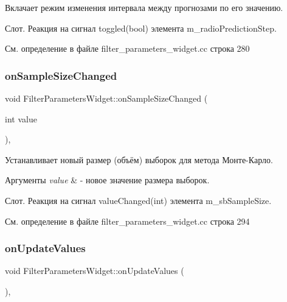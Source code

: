 Вклачает режим изменения интервала между прогнозами по его значению. 

Слот. Реакция на сигнал toggled(bool) элемента m\+\_\+radio\+Prediction\+Step. 

См. определение в файле filter\+\_\+parameters\+\_\+widget.\+cc строка 280

\hypertarget{class_filter_parameters_widget_afc9adb2c97bb297c29a86c2e9ee123b5}{}\label{class_filter_parameters_widget_afc9adb2c97bb297c29a86c2e9ee123b5} 
\subsubsection{\texorpdfstring{on\+Sample\+Size\+Changed}{onSampleSizeChanged}}
{\footnotesize\ttfamily void Filter\+Parameters\+Widget\+::on\+Sample\+Size\+Changed (\begin{DoxyParamCaption}\item[{int}]{value }\end{DoxyParamCaption})\hspace{0.3cm}{\ttfamily [private]}, {\ttfamily [slot]}}



Устанавливает новый размер (объём) выборок для метода Монте-\/Карло. 


\begin{DoxyParams}{Аргументы}
{\em value} & -\/ новое значение размера выборок.\\
\hline
\end{DoxyParams}
Слот. Реакция на сигнал value\+Changed(int) элемента m\+\_\+sb\+Sample\+Size. 

См. определение в файле filter\+\_\+parameters\+\_\+widget.\+cc строка 294

\hypertarget{class_filter_parameters_widget_ad952425cf2dabf76a2f28d19caa2641f}{}\label{class_filter_parameters_widget_ad952425cf2dabf76a2f28d19caa2641f} 
\subsubsection{\texorpdfstring{on\+Update\+Values}{onUpdateValues}}
{\footnotesize\ttfamily void Filter\+Parameters\+Widget\+::on\+Update\+Values (\begin{DoxyParamCaption}{ }\end{DoxyParamCaption})\hspace{0.3cm}{\ttfamily [private]}, {\ttfamily [slot]}}




